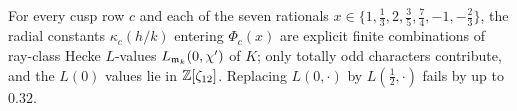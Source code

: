 \begin{conjecture}\label{thm:K}
For every cusp row $c$ and each of the seven rationals $x\in\{1,\tfrac13,2,\tfrac35,\tfrac74,-1,-\tfrac23\}$, the radial
constants $\kappa_c(h/k)$ entering $\Phi_c(x)$ are explicit finite combinations of ray-class Hecke $L$-values
$L_{\mathfrak{m}_k}(0,\chi')$ of $K$; only totally odd characters contribute, and the $L(0)$ values lie in $\mathbb{Z}[\zeta_{12}]$.
Replacing $L(0,\cdot)$ by $L(\tfrac12,\cdot)$ fails by up to $0.32$.
\end{conjecture}
